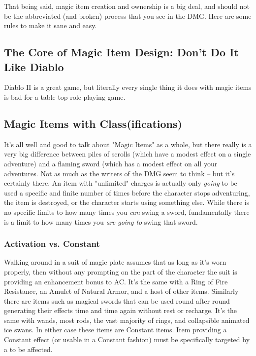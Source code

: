 That being said, magic item creation and ownership is a big deal, and should not be the abbreviated (and broken) process that you see in the DMG. Here are some rules to make it sane and easy.

\subsection{The Core of Magic Item Design: Don't Do It Like Diablo}

Diablo II is a great game, but literally every single thing it does with magic items is bad for a table top role playing game.

\subsection{Magic Items with Class(ifications)}

It's all well and good to talk about "Magic Items" as a whole, but there really is a very big difference between piles of scrolls (which have a modest effect on a single adventure) and a flaming sword (which has a modest effect on all your adventures. Not as much as the writers of the DMG seem to think -- but it's certainly there. An item with "unlimited" charges is actually only  \textit{going} to be used a specific and finite number of times before the character stops adventuring, the item is destroyed, or the character starts using something else. While there is no specific limits to how many times you \textit{can} swing a sword, fundamentally there is a limit to how many times you \textit{are going to} swing that sword.

\subsubsection{Activation vs. Constant}

Walking around in a suit of magic plate assumes that as long as it's worn properly, then without any prompting on the part of the character the suit is providing an enhancement bonus to AC. It's the same with a Ring of Fire Resistance, an Amulet of Natural Armor, and a host of other items. Similarly there are items such as magical swords that can be used round after round generating their effects time and time again without rest or recharge. It's the same with wands, most rods, the vast majority of rings, and collapsible animated ice swans. In either case these items are Constant items. Item providing a Constant effect (or usable in a Constant fashion) must be specifically targeted by a  to be affected.

